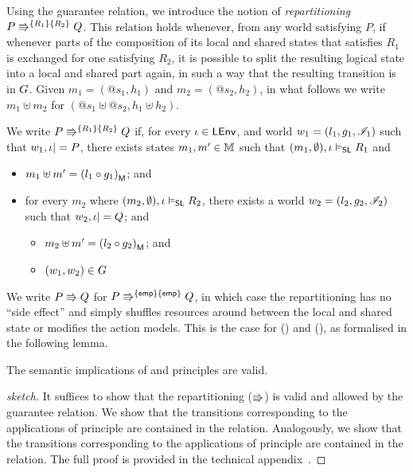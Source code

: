 Using the guarantee relation, we introduce the notion of \emph{repartitioning} $\repartitions{P}{Q}{R_1}{R_2}$. This relation holds whenever, from any world satisfying $P$, if whenever parts of the composition of its local and shared states that satisfies $R_1$ is exchanged for one satisfying $R_2$, it is possible to split the resulting logical state into a local and shared part again, in such a way that the resulting transition is in $\guarantee$. Given $m_1 = (@s_1, h_1)$ and $m_2 = (@s_2, h_2)$, in what follows we write $m_1 \uplus m_2$ for $(@s_1 \uplus @s_2, h_1 \uplus h_2)$.
%
%
\begin{definition}[Repartitioning] \label{def:repartitioning}
We write $\repartitions{P}{Q}{R_1}{R_2}$ if, for every $\lenv \in \LEnv$, and world $w_1 = (l_1, g_1, \lmod_1)$ such that $w_1, \lenv |= P$, there exists states $m_1, m' \in \Heaps$ such that $(m_1, \emptyset), \lenv \slsat R_1$ and
\begin{itemize} 
\item $m_1 \uplus m' = \heapPart{\left(l_1 \composeL g_1\right)}$; and
\item for every $m_2$ where $(m_2, \emptyset), \lenv \slsat R_2$,
  there exists a world $w_2 = (l_2, g_2, \lmod_2)$ such that $w_2, \lenv |= Q$; and
  \begin{itemize}
  	\item $m_2 \uplus m' = \heapPart{\left(l_2 \composeL g_2\right)}$; and
  	\item $(w_1, w_2) \in \guarantee$
  \end{itemize}
\end{itemize}
\end{definition}

We write $P \semimplies Q$ for $\repartitions{P}{Q}{\emp}{\emp} $, in which case the repartitioning has no ``side effect'' and simply shuffles resources around between the local and shared state or modifies the action models. This is the case for (\shiftRule) and (\extendRule), as formalised in the following lemma.
%
%
\begin{lemma}
The semantic implications of \extendRule and \shiftRule principles are valid. 
\begin{proof}[sketch]
It suffices to show that the repartitioning ($\semimplies$) is valid and allowed by the guarantee relation. We show that the transitions corresponding to the applications of \extendRule principle are contained in the \extendG relation. Analogously, we show that the transitions corresponding to the applications of \shiftRule principle are contained in the \shiftG relation. The full proof is provided in the technical appendix~\cite{colosl-tr14}.
\end{proof}
\end{lemma}
%
%
